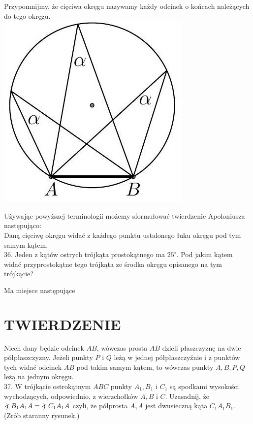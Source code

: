 \documentclass[10pt]{article}
\newcommand\Varangle{\mathop{{<\!\!\!\!\!\text{\small)}}\:}\nolimits}
\begin{document}
Przypomnijmy, że cięciwa okręgu nazywamy każdy odcinek o końcach należących do tego okręgu.\\
\includegraphics[max width=\textwidth, center]{2024_11_21_71f62bd117d375398909g-188(1)}

Używając powyższej terminologii możemy sformułować twierdzenie Apoloniusza następująco:\\
Daną cięciwę okręgu widać z każdego punktu ustalonego łuku okręgu pod tym samym kątem.\\
36. Jeden z kątów ostrych trójkąta prostokątnego ma \(25^{\circ}\). Pod jakim kątem widać przyprostokątne tego trójkąta ze środka okręgu opisanego na tym trójkącie?

Ma miejsce następujące

\section*{TWIERDZENIE}
Niech dany będzie odcinek \(A B\), wówczas prosta \(A B\) dzieli płaszczyznę na dwie półpłaszczyzny. Jeżeli punkty \(P\) i \(Q\) leżą w jednej półpłaszczyźnie i z punktów tych widać odcinek \(A B\) pod takim samym kątem, to wówczas punkty \(A, B, P, Q\) leżą na jednym okręgu.\\
37. W trójkącie ostrokątnym \(A B C\) punkty \(A_{1}, B_{1}\) i \(C_{1}\) są spodkami wysokości wychodzących, odpowiednio, z wierzchołków \(A, B\) i \(C\). Uzasadnij, że \(\Varangle B_{1} A_{1} A=\Varangle C_{1} A_{1} A\) czyli, że półprosta \(A_{1} A\) jest dwusieczną kąta \(C_{1} A_{1} B_{1}\). (Zrób staranny rysunek.)
\end{document}
